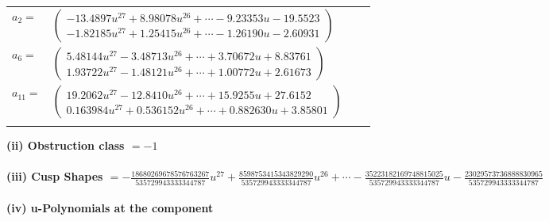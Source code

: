 \documentclass[1p]{elsarticle_modified}
\theoremstyle{definition}
\begin{document}
\begin{tabular}{m{7pt} m{180pt} m{7pt} m{180pt} }
\flushright $a_{2}=$&$\begin{pmatrix}-13.4897 u^{27}+8.98078 u^{26}+\cdots-9.23353 u-19.5523\\-1.82185 u^{27}+1.25415 u^{26}+\cdots-1.26190 u-2.60931\end{pmatrix}$ \\
\flushright $a_{6}=$&$\begin{pmatrix}5.48144 u^{27}-3.48713 u^{26}+\cdots+3.70672 u+8.83761\\1.93722 u^{27}-1.48121 u^{26}+\cdots+1.00772 u+2.61673\end{pmatrix}$ \\
\flushright $a_{11}=$&$\begin{pmatrix}19.2062 u^{27}-12.8410 u^{26}+\cdots+15.9255 u+27.6152\\0.163984 u^{27}+0.536152 u^{26}+\cdots+0.882630 u+3.85801\end{pmatrix}$\\&\end{tabular}
\flushleft \textbf{(ii) Obstruction class $= -1$}\\~\\
\flushleft \textbf{(iii) Cusp Shapes $= -\frac{18680269678576763267}{535729943333344787} u^{27}+\frac{8598753415343829290}{535729943333344787} u^{26}+\cdots-\frac{35223182169748815025}{535729943333344787} u-\frac{23029573736888830965}{535729943333344787}$}\\~\\
\newpage\renewcommand{\arraystretch}{1}
\flushleft \textbf{(iv) u-Polynomials at the component}\newline \\
\end{document}
